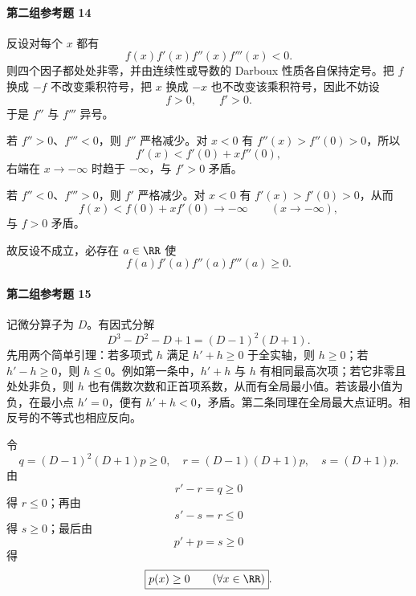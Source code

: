 \paragraph{第二组参考题 14}
\begin{xsolution}
反设对每个 $x$ 都有
\[
  f(x)f'(x)f''(x)f'''(x)<0.
\]
则四个因子都处处非零，并由连续性或导数的 Darboux 性质各自保持定号。把 $f$ 换成 $-f$ 不改变乘积符号，把 $x$ 换成 $-x$ 也不改变该乘积符号，因此不妨设
\[
  f>0,\qquad f'>0.
\]
于是 $f''$ 与 $f'''$ 异号。

若 $f''>0$、$f'''<0$，则 $f''$ 严格减少。对 $x<0$ 有 $f''(x)>f''(0)>0$，所以
\[
  f'(x)<f'(0)+x f''(0),
\]
右端在 $x\to-\infty$ 时趋于 $-\infty$，与 $f'>0$ 矛盾。

若 $f''<0$、$f'''>0$，则 $f'$ 严格减少。对 $x<0$ 有 $f'(x)>f'(0)>0$，从而
\[
  f(x)<f(0)+x f'(0)\to-\infty
  \qquad(x\to-\infty),
\]
与 $f>0$ 矛盾。

故反设不成立，必存在 $a\in\RR$ 使
\[
  \boxed{f(a)f'(a)f''(a)f'''(a)\ge0}.
\]
\end{xsolution}

\paragraph{第二组参考题 15}
\begin{xsolution}
记微分算子为 $D$。有因式分解
\[
  D^3-D^2-D+1=(D-1)^2(D+1).
\]
先用两个简单引理：若多项式 $h$ 满足 $h'+h\ge0$ 于全实轴，则 $h\ge0$；若 $h'-h\ge0$，则 $h\le0$。例如第一条中，$h'+h$ 与 $h$ 有相同最高次项；若它非零且处处非负，则 $h$ 也有偶数次数和正首项系数，从而有全局最小值。若该最小值为负，在最小点 $h'=0$，便有 $h'+h<0$，矛盾。第二条同理在全局最大点证明。相反号的不等式也相应反向。

令
\[
  q=(D-1)^2(D+1)p\ge0,
  \quad r=(D-1)(D+1)p,
  \quad s=(D+1)p.
\]
由
\[
  r'-r=q\ge0
\]
得 $r\le0$；再由
\[
  s'-s=r\le0
\]
得 $s\ge0$；最后由
\[
  p'+p=s\ge0
\]
得
\[
  \boxed{p(x)\ge0\qquad(\forall x\in\RR)}.
\]
\end{xsolution}

